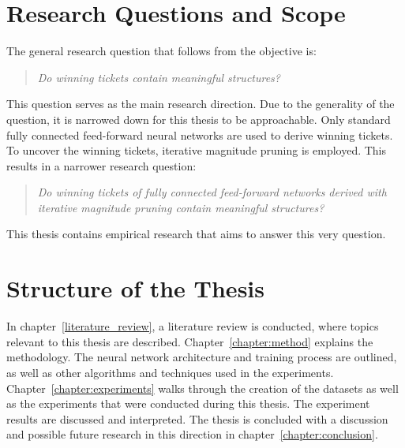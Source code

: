 \section{Research Questions and Scope}
The general research question that follows from the objective is: 
\begin{quote}
\textit{Do winning tickets contain meaningful structures?}
\end{quote}
This question serves as the main research direction.
Due to the generality of the question, it is narrowed down for this thesis to be approachable.
Only standard fully connected feed-forward neural networks are used to derive winning tickets.
To uncover the winning tickets, iterative magnitude pruning is employed.
This results in a narrower research question:
\begin{quote}
\textit{Do winning tickets of fully connected feed-forward networks derived with iterative magnitude pruning contain meaningful structures?}
\end{quote}
This thesis contains empirical research that aims to answer this very question.


\section{Structure of the Thesis}
In chapter~\ref{literature_review}, a literature review is conducted, where topics relevant to this thesis are described.
Chapter~\ref{chapter:method} explains the methodology.
The neural network architecture and training process are outlined, as well as other algorithms and techniques used in the experiments.
Chapter~\ref{chapter:experiments} walks through the creation of the datasets as well as the experiments that were conducted during this thesis.
The experiment results are discussed and interpreted.
The thesis is concluded with a discussion and possible future research in this direction in chapter~\ref{chapter:conclusion}.